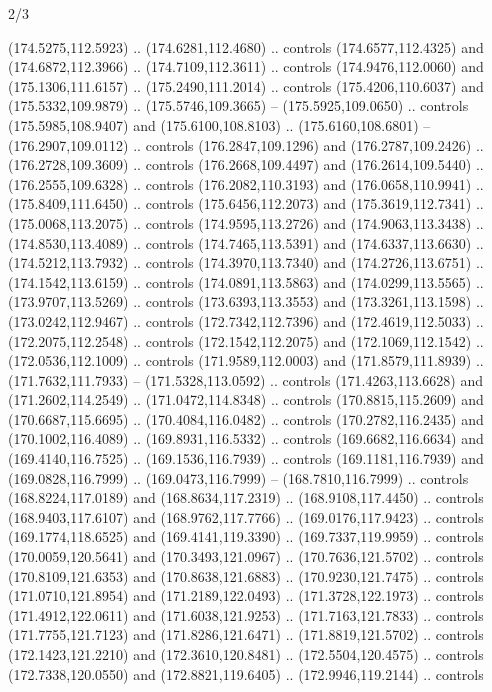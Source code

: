 \begin{flagdescription}{2/3}
\begin{scope}[shift={(0.5\flaglength,0.5)},scale=\flagwidth/320]
\begin{scope}[y=0.8pt, x=0.8pt, yscale=-1,shift={(-118.3,-146)}]
  (174.5275,112.5923) .. (174.6281,112.4680) .. controls (174.6577,112.4325) and
  (174.6872,112.3966) .. (174.7109,112.3611) .. controls (174.9476,112.0060) and
  (175.1306,111.6157) .. (175.2490,111.2014) .. controls (175.4206,110.6037) and
  (175.5332,109.9879) .. (175.5746,109.3665) -- (175.5925,109.0650) .. controls
  (175.5985,108.9407) and (175.6100,108.8103) .. (175.6160,108.6801) --
  (176.2907,109.0112) .. controls (176.2847,109.1296) and (176.2787,109.2426) ..
  (176.2728,109.3609) .. controls (176.2668,109.4497) and (176.2614,109.5440) ..
  (176.2555,109.6328) .. controls (176.2082,110.3193) and (176.0658,110.9941) ..
  (175.8409,111.6450) .. controls (175.6456,112.2073) and (175.3619,112.7341) ..
  (175.0068,113.2075) .. controls (174.9595,113.2726) and (174.9063,113.3438) ..
  (174.8530,113.4089) .. controls (174.7465,113.5391) and (174.6337,113.6630) ..
  (174.5212,113.7932) .. controls (174.3970,113.7340) and (174.2726,113.6751) ..
  (174.1542,113.6159) .. controls (174.0891,113.5863) and (174.0299,113.5565) ..
  (173.9707,113.5269) .. controls (173.6393,113.3553) and (173.3261,113.1598) ..
  (173.0242,112.9467) .. controls (172.7342,112.7396) and (172.4619,112.5033) ..
  (172.2075,112.2548) .. controls (172.1542,112.2075) and (172.1069,112.1542) ..
  (172.0536,112.1009) .. controls (171.9589,112.0003) and (171.8579,111.8939) ..
  (171.7632,111.7933) -- (171.5328,113.0592) .. controls (171.4263,113.6628) and
  (171.2602,114.2549) .. (171.0472,114.8348) .. controls (170.8815,115.2609) and
  (170.6687,115.6695) .. (170.4084,116.0482) .. controls (170.2782,116.2435) and
  (170.1002,116.4089) .. (169.8931,116.5332) .. controls (169.6682,116.6634) and
  (169.4140,116.7525) .. (169.1536,116.7939) .. controls (169.1181,116.7939) and
  (169.0828,116.7999) .. (169.0473,116.7999) -- (168.7810,116.7999) .. controls
  (168.8224,117.0189) and (168.8634,117.2319) .. (168.9108,117.4450) .. controls
  (168.9403,117.6107) and (168.9762,117.7766) .. (169.0176,117.9423) .. controls
  (169.1774,118.6525) and (169.4141,119.3390) .. (169.7337,119.9959) .. controls
  (170.0059,120.5641) and (170.3493,121.0967) .. (170.7636,121.5702) .. controls
  (170.8109,121.6353) and (170.8638,121.6883) .. (170.9230,121.7475) .. controls
  (171.0710,121.8954) and (171.2189,122.0493) .. (171.3728,122.1973) .. controls
  (171.4912,122.0611) and (171.6038,121.9253) .. (171.7163,121.7833) .. controls
  (171.7755,121.7123) and (171.8286,121.6471) .. (171.8819,121.5702) .. controls
  (172.1423,121.2210) and (172.3610,120.8481) .. (172.5504,120.4575) .. controls
  (172.7338,120.0550) and (172.8821,119.6405) .. (172.9946,119.2144) .. controls

\end{scope}
\end{scope}
\end{flagdescription}
